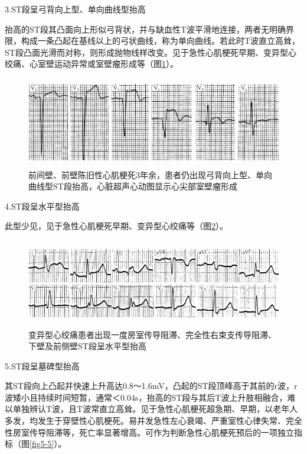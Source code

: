 3.ST段呈弓背向上型、单向曲线型抬高

抬高的ST段其凸面向上形似弓背状，并与缺血性T波平滑地连接，两者无明确界限，构成一条凸起在基线以上的弓状曲线，称为单向曲线。若此时T波直立高耸，ST段凸面光滑而对称，则形成抛物线样改变。见于急性心肌梗死早期、变异型心绞痛、心室壁运动异常或室壁瘤形成等（图\ref{fig5-3}）。

\begin{figure}[!htbp]
 \centering
 \includegraphics[width=5.07292in,height=1.55208in]{./images/Image00084.jpg}
 \captionsetup{justification=centering}
 \caption{前间壁、前壁陈旧性心肌梗死3年余，患者仍出现弓背向上型、单向曲线型ST段抬高，心脏超声心动图显示心尖部室壁瘤形成}
 \label{fig5-3}
  \end{figure} 

4.ST段呈水平型抬高

此型少见，见于急性心肌梗死早期、变异型心绞痛等（图\ref{fig5-4}）。

\begin{figure}[!htbp]
 \centering
 \includegraphics[width=5.58333in,height=1.51042in]{./images/Image00085.jpg}
 \captionsetup{justification=centering}
 \caption{变异型心绞痛患者出现一度房室传导阻滞、完全性右束支传导阻滞、下壁及前侧壁ST段呈水平型抬高}
 \label{fig5-4}
  \end{figure} 

5.ST段呈墓碑型抬高

其ST段向上凸起并快速上升高达0.8～1.6mV，凸起的ST段顶峰高于其前的r波，r波矮小且持续时间短暂，通常＜0.04s，抬高的ST段与其后T波上升肢相融合，难以单独辨认T波，且T波常直立高耸。见于急性心肌梗死超急期、早期，以老年人多发，均发生于穿壁性心肌梗死。易并发急性左心衰竭、严重室性心律失常、完全性房室传导阻滞等，死亡率显著增高。可作为判断急性心肌梗死预后的一项独立指标（图\ref{fig5-5}）。

